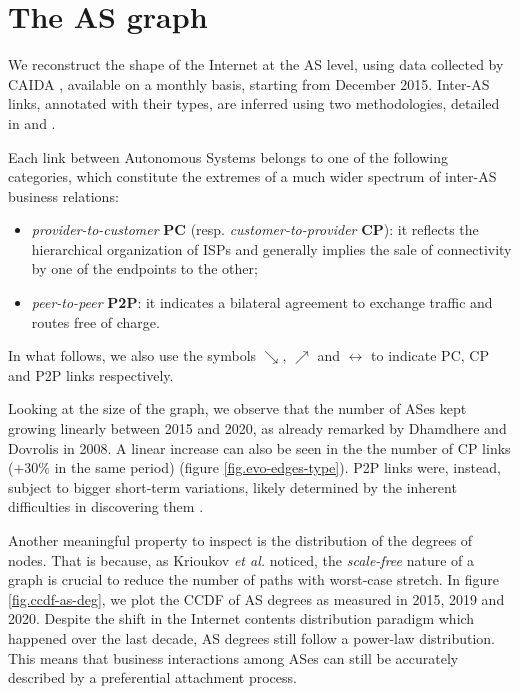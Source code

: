 \documentclass[a4paper,11pt,oneside]{report}
\begin{document}
\chapter{The AS graph}
\label{chap.as-graph}

We reconstruct the shape of the Internet at the AS level, using data collected by CAIDA \cite{GraphCAIDA}, available on a monthly basis, starting from December 2015. Inter-AS links, annotated with their types, are inferred using two methodologies, detailed in \cite{luckieRelationshipsCustomerCones2013} and \cite{giotsasInferringMultilateralPeering2013}.

\bigskip
Each link between Autonomous Systems belongs to one of the following categories, which constitute the extremes of a much wider spectrum of inter-AS business relations:
\begin{itemize}
\item \emph{provider-to-customer} \textbf{PC} (resp. \emph{customer-to-provider} \textbf{CP}): it reflects the hierarchical organization of ISPs and generally implies the sale of connectivity by one of the endpoints to the other;
\item \emph{peer-to-peer} \textbf{P2P}: it indicates a bilateral agreement to exchange traffic and routes free of charge.
\end{itemize}
In what follows, we also use the symbols $\searrow$, $\nearrow$ and $\longleftrightarrow$ to indicate PC, CP and P2P links respectively.

\bigskip
Looking at the size of the graph, we observe that the number of ASes kept growing linearly between 2015 and 2020, as already remarked by Dhamdhere and Dovrolis \cite{dhamdhereTenYearsEvolution2008} in 2008. A linear increase can also be seen in the the number of CP links ($+30\%$ in the same period) (figure \ref{fig.evo-edges-type}). P2P links were, instead, subject to bigger short-term variations, likely determined by the inherent difficulties in discovering them \cite{dhamdhereTenYearsEvolution2008}.

\bigskip
Another meaningful property to inspect is the distribution of the degrees of nodes. That is because, as Krioukov \textit{et al.} \cite{krioukovCompactRoutingInternet2007} noticed, the \emph{scale-free} nature of a graph is crucial to reduce the number of paths with worst-case stretch. In figure \ref{fig.ccdf-as-deg}, we plot the CCDF of AS degrees as measured in 2015, 2019 and 2020. Despite the shift in the Internet contents distribution paradigm which happened over the last decade, AS degrees still follow a power-law distribution. This means that business interactions among ASes can still be accurately described by a preferential attachment process.
\end{document}
